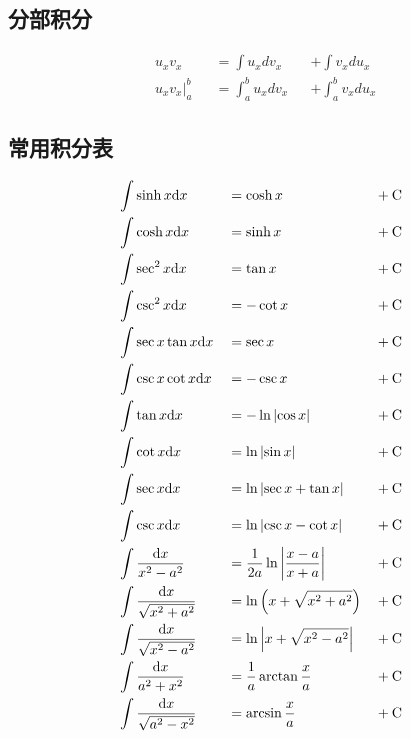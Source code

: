 \documentclass{article}
\begin{document}
\subsection{分部积分}

\[\begin{aligned}
         & u_xv_x                  &  & =\int{u_xdv_x}     &  & +\int{v_xdu_x}     \\
         & \left.u_xv_x\right|_a^b &  & =\int_a^b{u_xdv_x} &  & +\int_a^b{v_xdu_x}\end{aligned}\]

\subsection{常用积分表}

\[\begin{aligned}
         & \int\sinh x\mathrm d x                 &  & =\cosh x                            &  & +\mathrm C \\
         & \int\cosh x\mathrm d x                 &  & =\sinh x                            &  & +\mathrm C \\
         & \int\sec^2 x\mathrm d x                &  & =\tan x                             &  & +\mathrm C \\
         & \int\csc^2 x\mathrm d x                &  & =-\cot x                            &  & +\mathrm C \\
         & \int\sec x\tan x\mathrm d x            &  & =\sec x                             &  & +\mathrm C \\
         & \int\csc x\cot x\mathrm d x            &  & =-\csc x                            &  & +\mathrm C \\
         & \int\tan x\mathrm d x                  &  & =-\ln\left|\cos x\right|                   &  & +\mathrm C \\
         & \int\cot x\mathrm d x                  &  & =\ln\left|\sin x\right|                    &  & +\mathrm C \\
         & \int\sec x\mathrm d x                  &  & =\ln\left|\sec x+\tan x\right|             &  & +\mathrm C \\
         & \int\csc x\mathrm d x                  &  & =\ln\left|\csc x-\cot x\right|             &  & +\mathrm C \\
         & \int\frac{\mathrm d x}{x^2-a^2}        &  & =\frac1{2a}\ln\left|\frac{x-a}{x+a}\right| &  & +\mathrm C \\
         & \int\frac{\mathrm d x}{\sqrt{x^2+a^2}} &  & =\ln\left(x+\sqrt{x^2+a^2}\right)            &  & +\mathrm C \\
         & \int\frac{\mathrm d x}{\sqrt{x^2-a^2}} &  & =\ln\left|x+\sqrt{x^2-a^2}\right|          &  & +\mathrm C \\
         & \int\frac{\mathrm d x}{a^2+x^2}        &  & =\frac1a\arctan\frac xa             &  & +\mathrm C \\
         & \int\frac{\mathrm d x}{\sqrt{a^2-x^2}} &  & =\arcsin{\frac xa}                  &  & +\mathrm C
    \end{aligned}\]
\end{document}
